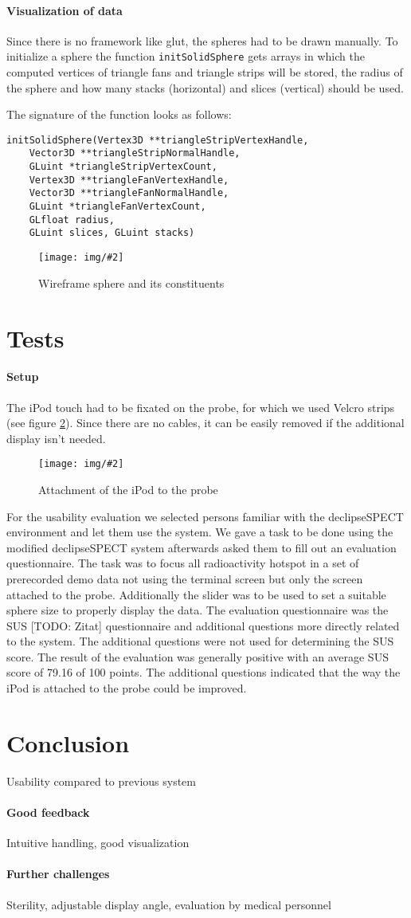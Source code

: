 \documentclass{scrartcl}
\newcommand{\graphic}[3][width=\linewidth] %
{
  \begin{figure}[h!t]
    \centering
    \texttt{[image: img/\#2]}
    \caption{#3}
    \label{fig:#2}
  \end{figure}
}
\newcommand{\refFigure}[1]{figure \ref{fig:#1}}
\begin{document}
\paragraph*{Visualization of data}
Since there is no framework like glut, the spheres had to be drawn manually. To initialize a sphere the function \verb|initSolidSphere| gets arrays in which the computed vertices of triangle fans and triangle strips will be stored, the radius of the sphere and how many stacks (horizontal) and slices (vertical) should be used.

The signature of the function looks as follows:
\begin{verbatim}
initSolidSphere(Vertex3D **triangleStripVertexHandle,
    Vector3D **triangleStripNormalHandle,
    GLuint *triangleStripVertexCount,
    Vertex3D **triangleFanVertexHandle,
    Vector3D **triangleFanNormalHandle,
    GLuint *triangleFanVertexCount,
    GLfloat radius,
    GLuint slices, GLuint stacks)
\end{verbatim}
\graphic[scale=.5]{sphere}{Wireframe sphere and its constituents}


\section{Tests}
\paragraph*{Setup}
The iPod touch had to be fixated on the probe, for which we used Velcro strips (see \refFigure{probe}). Since there are no cables, it can be easily removed if the additional display isn't needed.
\graphic[scale=.5]{probe}{Attachment of the iPod to the probe}

For the usability evaluation we selected persons familiar with the declipseSPECT environment and let them use the system. We gave a task to be done using the modified declipseSPECT system afterwards asked them to fill out an evaluation questionnaire.
The task was to focus all radioactivity hotspot in a set of prerecorded demo data not using the terminal screen but only the screen attached to the probe. Additionally the slider was to be used to set a suitable sphere size to properly display the data. The evaluation questionnaire was the SUS [TODO: Zitat] questionnaire and additional questions more directly related to the system. The additional questions were not used for determining the SUS score.
The result of the evaluation was generally positive with an average SUS score of 79.16 of 100 points. The additional questions indicated that the way the iPod is attached to the probe could be improved.



\section{Conclusion}
Usability compared to previous system
\paragraph*{Good feedback}
Intuitive handling, good visualization
\paragraph*{Further challenges}
Sterility, adjustable display angle, evaluation by medical personnel




\end{document}
